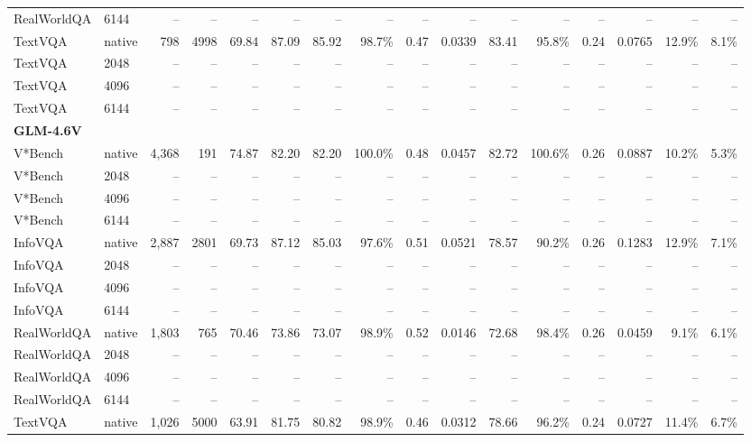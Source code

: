 \begin{table}[t]
{\begin{tabular}{llrrrrrrrrrrrrrr}
RealWorldQA & 6144 & -- & -- & -- & -- & -- & -- & -- & -- & -- & -- & -- & -- & -- & -- \\
TextVQA & native & 798 & 4998 & 69.84 & 87.09 & 85.92 & 98.7\% & 0.47 & 0.0339 & 83.41 & 95.8\% & 0.24 & 0.0765 & 12.9\% & 8.1\% \\
TextVQA & 2048 & -- & -- & -- & -- & -- & -- & -- & -- & -- & -- & -- & -- & -- & -- \\
TextVQA & 4096 & -- & -- & -- & -- & -- & -- & -- & -- & -- & -- & -- & -- & -- & -- \\
TextVQA & 6144 & -- & -- & -- & -- & -- & -- & -- & -- & -- & -- & -- & -- & -- & -- \\
\midrule
\multicolumn{10}{l}{\textbf{GLM-4.6V}} \\
V*Bench & native & 4,368 & 191 & 74.87 & 82.20 & 82.20 & 100.0\% & 0.48 & 0.0457 & 82.72 & 100.6\% & 0.26 & 0.0887 & 10.2\% & 5.3\% \\
V*Bench & 2048 & -- & -- & -- & -- & -- & -- & -- & -- & -- & -- & -- & -- & -- & -- \\
V*Bench & 4096 & -- & -- & -- & -- & -- & -- & -- & -- & -- & -- & -- & -- & -- & -- \\
V*Bench & 6144 & -- & -- & -- & -- & -- & -- & -- & -- & -- & -- & -- & -- & -- & -- \\
InfoVQA & native & 2,887 & 2801 & 69.73 & 87.12 & 85.03 & 97.6\% & 0.51 & 0.0521 & 78.57 & 90.2\% & 0.26 & 0.1283 & 12.9\% & 7.1\% \\
InfoVQA & 2048 & -- & -- & -- & -- & -- & -- & -- & -- & -- & -- & -- & -- & -- & -- \\
InfoVQA & 4096 & -- & -- & -- & -- & -- & -- & -- & -- & -- & -- & -- & -- & -- & -- \\
InfoVQA & 6144 & -- & -- & -- & -- & -- & -- & -- & -- & -- & -- & -- & -- & -- & -- \\
RealWorldQA & native & 1,803 & 765 & 70.46 & 73.86 & 73.07 & 98.9\% & 0.52 & 0.0146 & 72.68 & 98.4\% & 0.26 & 0.0459 & 9.1\% & 6.1\% \\
RealWorldQA & 2048 & -- & -- & -- & -- & -- & -- & -- & -- & -- & -- & -- & -- & -- & -- \\
RealWorldQA & 4096 & -- & -- & -- & -- & -- & -- & -- & -- & -- & -- & -- & -- & -- & -- \\
RealWorldQA & 6144 & -- & -- & -- & -- & -- & -- & -- & -- & -- & -- & -- & -- & -- & -- \\
TextVQA & native & 1,026 & 5000 & 63.91 & 81.75 & 80.82 & 98.9\% & 0.46 & 0.0312 & 78.66 & 96.2\% & 0.24 & 0.0727 & 11.4\% & 6.7\% \\

\end{tabular}}
\end{table}
